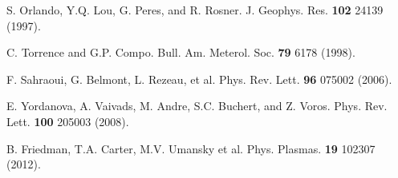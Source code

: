 \documentclass[aps,prx,twocolumn,secnumarabic,nobalancelastpage,amsmath,amssymb,
nofootinbib]{revtex4-1}
\begin{document}
\begin{thebibliography}{99}
S. Orlando, Y.Q. Lou, G. Peres, and R. Rosner. J. Geophys. Res. {\bf 102} 24139 (1997).

C. Torrence and G.P. Compo. Bull. Am. Meterol. Soc. {\bf 79} 6178 (1998).

F. Sahraoui, G. Belmont, L. Rezeau, et al. Phys. Rev. Lett. {\bf 96} 075002 (2006).

E. Yordanova, A. Vaivads, M. Andre, S.C. Buchert, and Z. Voros. Phys. Rev. Lett. {\bf 100} 205003 (2008).

B. Friedman, T.A. Carter, M.V. Umansky et al. Phys. Plasmas. {\bf 19} 102307 (2012).

\end{thebibliography}
\end{document}
